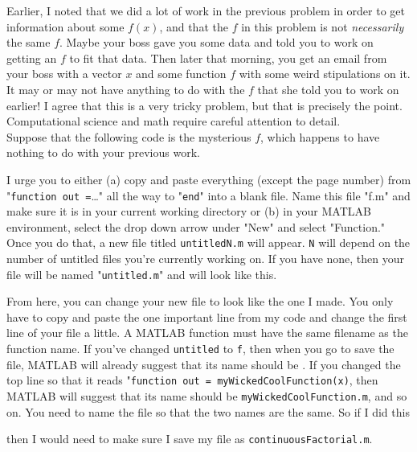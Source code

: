 \documentclass{article}
\begin{document}
Earlier, I noted that we did a lot of work in the previous problem in order to get information about some $f(x)$, and that the $f$ in this problem is not \textit{necessarily} the same $f$. Maybe your boss gave you some data and told you to work on getting an $f$ to fit that data. Then later that morning, you get an email from your boss with a vector $x$ and some function $f$ with some weird stipulations on it. It may or may not have anything to do with the $f$ that she told you to work on earlier! I agree that this is a very tricky problem, but that is precisely the point. Computational science and math require careful attention to detail.\\

Suppose that the following code is the mysterious $f$, which happens to have nothing to do with your previous work.



I urge you to either (a) copy and paste everything (except the page number) from "\texttt{function out =}\dots" all the way to "\texttt{end}" into a blank file. Name this file "f.m" and make sure it is in your current working directory or (b) in your MATLAB environment, select the drop down arrow under "New" and select "Function." Once you do that, a new file titled \texttt{untitledN.m} will appear. \texttt{N} will depend on the number of untitled files you're currently working on. If you have none, then your file will be named "\texttt{untitled.m}" and will look like this.



{\setlength{\parindent}{0cm}
From here, you can change your new file to look like the one I made. You only have to copy and paste the one important line from my code and change the first line of your file a little. A MATLAB function must have the same filename as the function name. If you've changed \texttt{untitled} to \texttt{f}, then when you go to save the file, MATLAB will already suggest that its name should be . If you changed the top line so that it reads "\texttt{function out = myWickedCoolFunction(x)}, then MATLAB will suggest that its name should be \texttt{myWickedCoolFunction.m}, and so on. You need to name the file so that the two names are the same. So if I did this}



{\setlength{\parindent}{0cm}
then I would need to make sure I save my file as \texttt{continuousFactorial.m}.} \\
\end{document}
